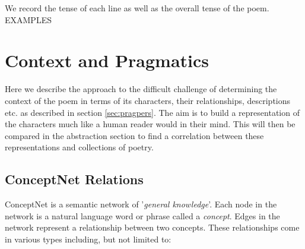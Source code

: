 We record the tense of each line as well as the overall tense of the poem. EXAMPLES

\section{Context and Pragmatics}
Here we describe the approach to the difficult challenge of determining the context of the poem in terms of its characters, their relationships, descriptions etc. as described in section \ref{sec:pragpers}. The aim is to build a representation of the characters much like a human reader would in their mind. This will then be compared in the abstraction section to find a correlation between these representations and collections of poetry.

\subsection{ConceptNet Relations}
ConceptNet is a semantic network of '\textit{general knowledge}'. Each node in the network is a natural language word or phrase called a \textit{concept}. Edges in the network represent a relationship between two concepts. These relationships come in various types including, but not limited to:


